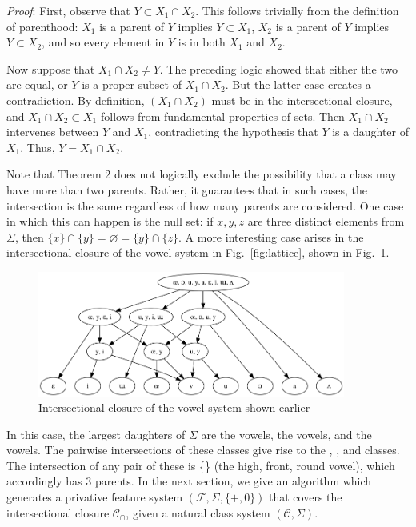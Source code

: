 \documentclass[11pt, oneside]{article}   	%
\begin{document}
\textit{Proof}: First, observe that $Y \subset X_1 \cap X_2$. This follows trivially from the definition of parenthood: $X_1$ is a parent of $Y$ implies $Y \subset X_1$, $X_2$ is a parent of $Y$ implies $Y \subset X_2$, and so every element in $Y$ is in both $X_1$ and $X_2$.

Now suppose that $X_1 \cap X_2 \neq Y$. The preceding logic showed that either the two are equal, or $Y$ is a proper subset of  $X_1 \cap X_2$. But the latter case creates a contradiction. By definition, $(X_1 \cap X_2)$ must be in the intersectional closure, and $X_1 \cap X_2 \subset X_1$ follows from fundamental properties of sets. Then $X_1 \cap X_2$ intervenes between $Y$ and $X_1$, contradicting the hypothesis that $Y$ is a daughter of $X_1$. Thus, $Y = X_1 \cap X_2$.
	
\vspace{\baselineskip} Note that Theorem 2 does not logically exclude the possibility that a class may have more than two parents. Rather, it guarantees that in such cases, the intersection is the same regardless of how many parents are considered. One case in which this can happen is the null set: if $x, y, z$ are three distinct elements from $\Sigma$, then $\{ x \} \cap \{ y \} = \varnothing = \{ y \} \cap \{ z \}$. A more interesting case arises in the intersectional closure of the vowel system in Fig.~\ref{fig:lattice}, shown in Fig.~\ref{fig:closure}. 

\begin{figure}[h]
\includegraphics[width=0.9\textwidth]{vowelHarmony_closure.png}
\caption{Intersectional closure of the vowel system shown earlier}
\label{fig:closure}
\end{figure}

In this case, the largest daughters of $\Sigma$ are the  vowels, the  vowels, and the  vowels. The pairwise intersections of these classes give rise to the , , and  classes. The intersection of any pair of these is \{\} (the high, front, round vowel), which accordingly has 3 parents. In the next section, we give an algorithm which generates a privative feature system $(\mathcal F, \Sigma, \{+, 0\})$ that covers the intersectional closure $\mathcal C_\cap$, given a natural class system $(\mathcal C, \Sigma)$.
\end{document}

